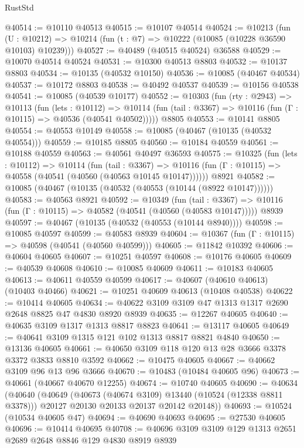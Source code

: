 \begin{lexlean}{RustStd}
\begin{coremodule}
@40514 := @10110 @40513
@40515 := @10107 @40514
@40524 := @10213
    (fun (U : @10212) => @10214 (fun (t : @7) => @10222 (@10085 (@10228 @36590 @10103) @10239)))
@40527 := @40489 (@40515 @40524) @36588
@40529 := @10070 @40514 @40524
@40531 := @10300 @40513 @8803
@40532 := @10137 @8803
@40534 := @10135 (@40532 @10150)
@40536 := @10085 (@40467 @40534)
@40537 := @10172 @8803
@40538 := @40492 @40537
@40539 := @10156 @40538
@40541 := @10085 (@40539 @10177)
@40552 := @10303
    (fun (rty : @2943) =>
    @10113
      (fun (lets : @10112) =>
      @10114 (fun (tail : @3367) => @10116 (fun (Γ : @10115) => @40536 (@40541 @40502)))))
    @8805
@40553 := @10141 @8805
@40554 := @40553 @10149
@40558 := @10085 (@40467 (@10135 (@40532 @40554)))
@40559 := @10185 @8805
@40560 := @10184 @40559
@40561 := @10188 @40559
@40563 := @40561 @40497 @36593
@40575 := @10325
    (fun (lets : @10112) =>
    @10114
      (fun (tail : @3367) =>
      @10116 (fun (Γ : @10115) => @40558 (@40541 (@40560 (@40563 @10145 @10147))))))
    @8921
@40582 := @10085 (@40467 (@10135 (@40532 (@40553 (@10144 (@8922 @10147))))))
@40583 := @40563 @8921
@40592 := @10349
    (fun (tail : @3367) => @10116 (fun (Γ : @10115) => @40582 (@40541 (@40560 (@40583 @10147)))))
    @8939
@40597 := @40467 (@10135 (@40532 (@40553 (@10144 @8940))))
@40598 := @10085 @40597
@40599 := @40583 @8939
@40604 := @10367 (fun (Γ : @10115) => @40598 (@40541 (@40560 @40599)))
@40605 := @11842 @10392
@40606 := @40604 @40605
@40607 := @10251 @40597
@40608 := @10176 @40605
@40609 := @40539 @40608
@40610 := @10085 @40609
@40611 := @10183 @40605
@40613 := @40611 @40559 @40599
@40617 := @40607 (@40610 @40613) (@10403 @40466)
@40621 := @10251 @40609 @40613 (@10408 @40538)
@40622 := @10414 @40605
@40634 := @40622 @3109 @3109 @47 @1313 @1317 @2690 @2648 @8825 @47 @4830 @8920 @8939
@40635 := @12267 @40605
@40640 := @40635 @3109 @1317 @1313 @8817 @8823
@40641 := @13117 @40605
@40649 := @40641 @3109 @1315 @121 @102 @1313 @8817 @8821 @4840
@40650 := @13136 @40605
@40661 := @40650 @3109 @118 @120 @13 @28 @3666 @3378 @3372 @3833 @8810 @3592
@40662 := @10475 @40605
@40667 := @40662 @3109 @96 @13 @96 @3666
@40670 := @10483 (@10484 @40605 @96)
@40673 := @40661 (@40667 @40670 @12255)
@40674 := @10740 @40605
@40690 := @40634
    (@40640
      (@40649
        (@40673 (@40674 @3109) @13440 (@10524 (@12338 @8811 @3378)))
        @20127
        @20130
        @20133
        @20137
        @20142
        @20148))
@40693 := @10524 (@10534 @40605 @47)
@40694 := @40690 @40693
@40695 := @27530 @40605
@40696 := @10414 @40695
@40708 := @40696 @3109 @3109 @129 @1313 @2651 @2689 @2648 @8846 @129 @4830 @8919 @8939

\end{coremodule}
\end{lexlean}
